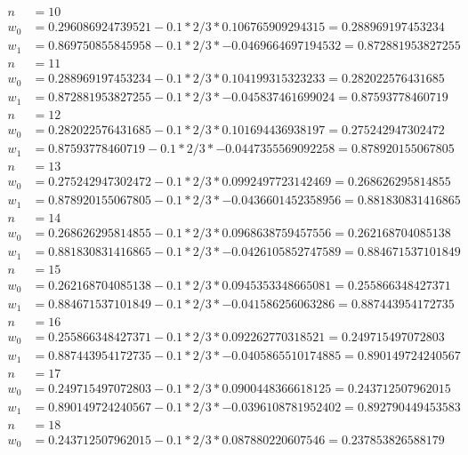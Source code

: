 \documentclass{report}
\begin{document}
\begin{equation} \label{eq1}
\begin{split}
n & = 10\\
w_0 & = 0.296086924739521 - 0.1 * 2/3 * 0.106765909294315 = 0.288969197453234\\
w_1 & = 0.869750855845958 - 0.1 * 2/3 * -0.0469664697194532 = 0.872881953827255\\
n & = 11\\
w_0 & = 0.288969197453234 - 0.1 * 2/3 * 0.104199315323233 = 0.282022576431685\\
w_1 & = 0.872881953827255 - 0.1 * 2/3 * -0.045837461699024 = 0.87593778460719\\
n & = 12\\
w_0 & = 0.282022576431685 - 0.1 * 2/3 * 0.101694436938197 = 0.275242947302472\\
w_1 & = 0.87593778460719 - 0.1 * 2/3 * -0.0447355569092258 = 0.878920155067805\\
n & = 13\\
w_0 & = 0.275242947302472 - 0.1 * 2/3 * 0.0992497723142469 = 0.268626295814855\\
w_1 & = 0.878920155067805 - 0.1 * 2/3 * -0.0436601452358956 = 0.881830831416865\\
n & = 14\\
w_0 & = 0.268626295814855 - 0.1 * 2/3 * 0.0968638759457556 = 0.262168704085138\\
w_1 & = 0.881830831416865 - 0.1 * 2/3 * -0.0426105852747589 = 0.884671537101849\\
n & = 15\\
w_0 & = 0.262168704085138 - 0.1 * 2/3 * 0.0945353348665081 = 0.255866348427371\\
w_1 & = 0.884671537101849 - 0.1 * 2/3 * -0.041586256063286 = 0.887443954172735\\
n & = 16\\
w_0 & = 0.255866348427371 - 0.1 * 2/3 * 0.092262770318521 = 0.249715497072803\\
w_1 & = 0.887443954172735 - 0.1 * 2/3 * -0.0405865510174885 = 0.890149724240567\\
n & = 17\\
w_0 & = 0.249715497072803 - 0.1 * 2/3 * 0.0900448366618125 = 0.243712507962015\\
w_1 & = 0.890149724240567 - 0.1 * 2/3 * -0.0396108781952402 = 0.892790449453583\\
n & = 18\\
w_0 & = 0.243712507962015 - 0.1 * 2/3 * 0.087880220607546 = 0.237853826588179\\

\end{split}
\end{equation}
\end{document}
